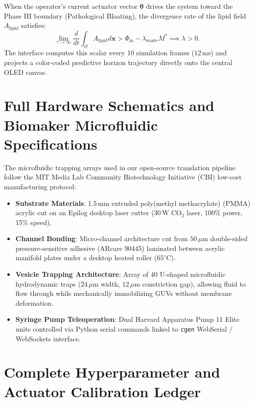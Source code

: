 \documentclass{article}
\begin{document}
When the operator's current actuator vector $\boldsymbol{\theta}$ drives the system toward the Phase III boundary (Pathological Bloating), the divergence rate of the lipid field $A_{\text{lipid}}$ satisfies:
\begin{equation}
\lim_{\tau \to \infty} \frac{d}{dt} \int_{\Omega} A_{\text{lipid}} d\mathbf{x} > \Phi_{\text{in}} - \lambda_{\text{waste}} M^* \implies \lambda > 0.
\end{equation}
The interface computes this scalar every 10 simulation frames ($12\,\text{ms}$) and projects a color-coded predictive horizon trajectory directly onto the central OLED canvas.

\section{Full Hardware Schematics and Biomaker Microfluidic Specifications}
\label{sec:appendix_hardware}

The microfluidic trapping arrays used in our open-source translation pipeline follow the MIT Media Lab Community Biotechnology Initiative (CBI) low-cost manufacturing protocol:
\begin{itemize}
    \item \textbf{Substrate Materials}: 1.5\,mm extruded poly(methyl methacrylate) (PMMA) acrylic cut on an Epilog desktop laser cutter ($30\,\text{W}$ $\text{CO}_2$ laser, 100\% power, 15\% speed).
    \item \textbf{Channel Bonding}: Micro-channel architecture cut from $50\,\mu\text{m}$ double-sided pressure-sensitive adhesive (ARcare 90445) laminated between acrylic manifold plates under a desktop heated roller ($65^\circ\text{C}$).
    \item \textbf{Vesicle Trapping Architecture}: Array of $40$ U-shaped microfluidic hydrodynamic traps ($24\,\mu\text{m}$ width, $12\,\mu\text{m}$ constriction gap), allowing fluid to flow through while mechanically immobilizing GUVs without membrane deformation.
    \item \textbf{Syringe Pump Teleoperation}: Dual Harvard Apparatus Pump 11 Elite units controlled via Python serial commands linked to \texttt{cgen} WebSerial / WebSockets interface.
\end{itemize}

\section{Complete Hyperparameter and Actuator Calibration Ledger}
\label{sec:appendix_ledger}
\end{document}
